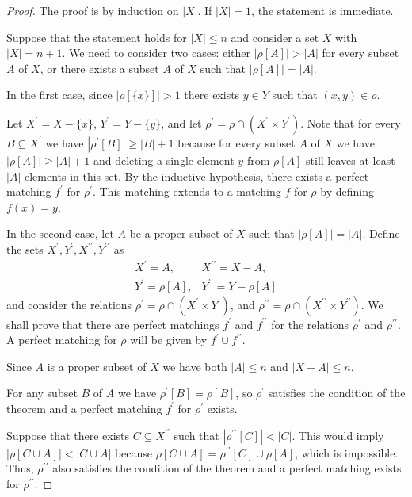 \documentclass[../main.tex]{subfiles}
\begin{document}
\begin{proof}
The proof is by induction on $|X|$. If $|X|=1$, the statement is immediate.

Suppose that the statement holds for $|X|\leqslant n$ and consider a set $X$ with $|X|=n+1$. We need to consider two cases: either $|\rho[A]|>|A|$ for every subset $A$ of $X$, or there exists a subset $A$ of $X$ such that $|\rho[A]|=|A|$.

In the first case, since $|\rho[\{x\}]|>1$ there exists $y\in Y$ such that $(x,y)\in\rho$.

Let $X^{\prime}=X-\{x\}$, $Y^{\prime}=Y-\{y\}$, and let $\rho^{\prime}=\rho\cap(X^{\prime}\times Y^{\prime})$. Note that for every $B\subseteq X^{\prime}$ we have $|\rho^{\prime}[B]|\geqslant|B|+1$ because for every subset $A$ of $X$ we have $|\rho[A]|\geqslant|A|+1$ and deleting a single element $y$ from $\rho[A]$ still leaves at least $|A|$ elements in this set. By the inductive hypothesis, there exists a perfect matching $f^{\prime}$ for $\rho^{\prime}$. This matching extends to a matching $f$ for $\rho$ by defining $f(x)=y$.

In the second case, let $A$ be a proper subset of $X$ such that $|\rho[A]|=|A|$. Define the sets $X^{\prime},Y^{\prime},X^{\prime\prime},Y^{\prime\prime}$ as
$$
\begin{array}{ll}
X^{\prime}=A, & X^{\prime\prime}=X-A, \\
Y^{\prime}=\rho[A], & Y^{\prime\prime}=Y-\rho[A]
\end{array}
$$
and consider the relations $\rho^{\prime}=\rho\cap(X^{\prime}\times Y^{\prime})$, and $\rho^{\prime\prime}=\rho\cap(X^{\prime\prime}\times Y^{\prime\prime})$. We shall prove that there are perfect matchings $f^{\prime}$ and $f^{\prime\prime}$ for the relations $\rho^{\prime}$ and $\rho^{\prime\prime}$. A perfect matching for $\rho$ will be given by $f^{\prime}\cup f^{\prime\prime}$.

Since $A$ is a proper subset of $X$ we have both $|A|\leqslant n$ and $|X-A|\leqslant n$.

For any subset $B$ of $A$ we have $\rho^{\prime}[B]=\rho[B]$, so $\rho^{\prime}$ satisfies the condition of the theorem and a perfect matching $f^{\prime}$ for $\rho^{\prime}$ exists.

Suppose that there exists $C\subseteq X^{\prime\prime}$ such that $|\rho^{\prime\prime}[C]|<|C|$. This would imply $|\rho[C\cup A]|<|C\cup A|$ because $\rho[C\cup A]=\rho^{\prime\prime}[C]\cup\rho[A]$, which is impossible. Thus, $\rho^{\prime\prime}$ also satisfies the condition of the theorem and a perfect matching exists for $\rho^{\prime\prime}$.
\end{proof}
\end{document}
